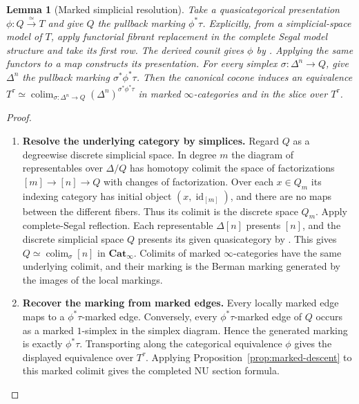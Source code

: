 \documentclass[oneside]{article}
\theoremstyle{plain}
\newtheorem{lemma}[theorem]{Lemma}
\theoremstyle{definition}
\theoremstyle{remark}
\newcommand{\Cat}{\mathbf{Cat}_{\infty}}
\newcommand{\id}{\operatorname{id}}
\begin{document}
\begin{lemma}[Marked simplicial resolution]\label{thz:lem:marked-resolution}
Take a quasicategorical presentation $\phi:Q\xrightarrow{\simeq}T$ and
give $Q$ the pullback marking $\phi^*\tau$. Explicitly, from a
simplicial-space model of $T$, apply functorial fibrant replacement
in the complete Segal model structure and take its first row.
The derived counit gives $\phi$ by \cite[Thm.~4.11]{JoyalTierney2007}.
Applying the same functors to a map constructs its presentation.  For every simplex
$\sigma:\Delta^n\to Q$, give $\Delta^n$ the pullback marking
$\sigma^*\phi^*\tau$.  Then the canonical cocone induces an equivalence $T^\tau\simeq \operatorname*{colim}_{\sigma:\Delta^n\to Q} (\Delta^n)^{\sigma^*\phi^*\tau}$ in marked $\infty$-categories and in the slice over $T^\tau$.
\end{lemma}
\begin{proof}
\leavevmode
\begin{enumerate}
\item \textbf{Resolve the underlying category by simplices.} Regard $Q$ as a degreewise discrete simplicial space.
In degree $m$ the diagram of representables over $\Delta/Q$ has
homotopy colimit the space of factorizations $[m]\to[n]\to Q$
with changes of factorization. Over each $x\in Q_m$ its indexing
category has initial object $(x,\id_{[m]})$, and there are no maps
between the different fibers. Thus its colimit is the discrete
space $Q_m$. Apply complete-Segal reflection. Each representable
$\Delta[n]$ presents $[n]$, and the discrete simplicial space $Q$
presents its given quasicategory by
\cite[Thm.~4.11]{JoyalTierney2007}. This gives
$Q\simeq\operatorname*{colim}_{\sigma}[n]$ in $\Cat$.  Colimits of marked
$\infty$-categories have the same underlying colimit, and their marking
is the Berman marking generated by the images of the local markings.
\item \textbf{Recover the marking from marked edges.} Every locally marked edge maps to a $\phi^*\tau$-marked edge.  Conversely,
every $\phi^*\tau$-marked edge of $Q$ occurs as a marked $1$-simplex in
the simplex diagram.  Hence the generated marking is exactly
$\phi^*\tau$.  Transporting along the categorical equivalence $\phi$
gives the displayed equivalence over $T^\tau$.  Applying
Proposition~\ref{prop:marked-descent} to this marked colimit gives
the completed NU section formula.\qedhere
\end{enumerate}
\end{proof}
\end{document}
